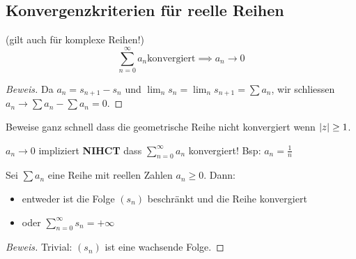 \subsection{Konvergenzkriterien für reelle Reihen}
\begin{Bem} (gilt auch für komplexe Reihen!)
  \[\sum^\infty_{n=0}a_n \text{konvergiert}\implies a_n\to 0\]
\end{Bem}
\begin{proof}[Beweis] Da $a_n = s_{n+1}- s_n$
und $\lim_n s_n = \lim_n s_{n+1} = \sum a_n$, wir schliessen
$a_n\to \sum a_n - \sum a_n = 0$.
\end{proof}
\begin{Ueb} Beweise
ganz schnell dass die geometrische Reihe nicht konvergiert wenn $\mathopen| z \mathclose|\geq 1$.
\end{Ueb}
\begin{Bem}
  $a_n\to 0$ impliziert {\bf NIHCT}
dass $\sum^\infty_{n=0}a_n$ konvergiert! Bsp: $a_n=\frac{1}{n}$
\end{Bem}

\begin{Sat}
  Sei $\sum a_n$ eine Reihe mit reellen Zahlen $a_n\geq 0$. Dann:
  \begin{itemize}
    \item entweder ist die Folge $(s_n)$ beschränkt und die Reihe konvergiert
    \item oder $\sum^\infty_{n=0}s_n=+\infty$
  \end{itemize}
\end{Sat}

\begin{proof}[Beweis] Trivial: $(s_n)$ ist eine wachsende Folge.
\end{proof}

